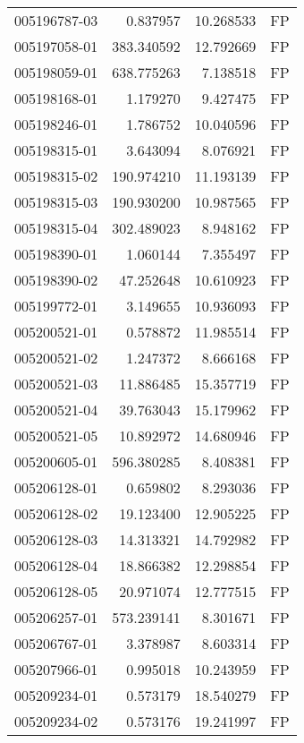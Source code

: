 \begin{tabular}{lrrl}
005196787-03 &    0.837957 &      10.268533 &   FP \\
005197058-01 &  383.340592 &      12.792669 &   FP \\
005198059-01 &  638.775263 &       7.138518 &   FP \\
005198168-01 &    1.179270 &       9.427475 &   FP \\
005198246-01 &    1.786752 &      10.040596 &   FP \\
005198315-01 &    3.643094 &       8.076921 &   FP \\
005198315-02 &  190.974210 &      11.193139 &   FP \\
005198315-03 &  190.930200 &      10.987565 &   FP \\
005198315-04 &  302.489023 &       8.948162 &   FP \\
005198390-01 &    1.060144 &       7.355497 &   FP \\
005198390-02 &   47.252648 &      10.610923 &   FP \\
005199772-01 &    3.149655 &      10.936093 &   FP \\
005200521-01 &    0.578872 &      11.985514 &   FP \\
005200521-02 &    1.247372 &       8.666168 &   FP \\
005200521-03 &   11.886485 &      15.357719 &   FP \\
005200521-04 &   39.763043 &      15.179962 &   FP \\
005200521-05 &   10.892972 &      14.680946 &   FP \\
005200605-01 &  596.380285 &       8.408381 &   FP \\
005206128-01 &    0.659802 &       8.293036 &   FP \\
005206128-02 &   19.123400 &      12.905225 &   FP \\
005206128-03 &   14.313321 &      14.792982 &   FP \\
005206128-04 &   18.866382 &      12.298854 &   FP \\
005206128-05 &   20.971074 &      12.777515 &   FP \\
005206257-01 &  573.239141 &       8.301671 &   FP \\
005206767-01 &    3.378987 &       8.603314 &   FP \\
005207966-01 &    0.995018 &      10.243959 &   FP \\
005209234-01 &    0.573179 &      18.540279 &   FP \\
005209234-02 &    0.573176 &      19.241997 &   FP \\

\end{tabular}
